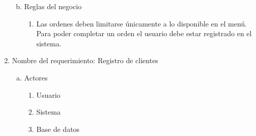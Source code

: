 \documentclass[conference]{IEEEtran}
\begin{document}
\begin{enumerate}
\begin{enumerate}[a)]
\begin{enumerate}[P{a}so 1.]
	\end{enumerate}
	
\item Reglas del negocio
	\begin{enumerate}[a]
	\item Las ordenes deben limitarse únicamente a lo disponible en el menú. Para poder completar un orden el usuario debe estar registrado en el sistema.
	\end{enumerate}
\end{enumerate}

\item Nombre del requerimiento: Registro de clientes
\begin{enumerate}[a)]
\item Actores
	\begin{enumerate}[a]
	\item Usuario 
	\item Sistema 
	\item Base de datos
	\end{enumerate}
	

\end{enumerate}
\end{enumerate}
\end{document}
